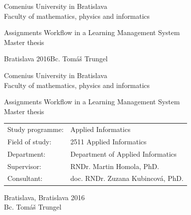 \documentclass[12pt, oneside]{book}
\def\mfrok{Bratislava 2016}
\def\mfnazov{Assignments Workflow in a Learning Management System}
\def\mftyp{Master thesis}
\def\mfautor{Bc. Tomáš Trungel}
\def\mfskolitel{RNDr. Martin Homola, PhD.}
\def\mfkonzultant{doc. RNDr. Zuzana Kubincová, PhD.}
\def\mfmiesto{Bratislava, \mfrok}
\def\mfodbor{2511 Applied Informatics}
\def\program{ Applied Informatics }
\def\mfpracovisko{ Department of Applied Informatics }
\begin{document}
     

\thispagestyle{empty}

\begin{center}
\sc\large
Comenius University in Bratislava\\
Faculty of mathematics, physics and informatics

\vfill

{\LARGE\mfnazov}\\
\mftyp
\end{center}

\vfill

{\sc\large 
\noindent 
\mfrok \hfill \hfill \mfautor
}

\eject %


\thispagestyle{empty}
\noindent

\begin{center}
\sc  
\large
Comenius University in Bratislava\\
Faculty of mathematics, physics and informatics

\vfill

{\LARGE\mfnazov}\\
\mftyp
\end{center}

\vfill

\noindent
\begin{tabular}{ll}
Study programme: & \program \\
Field of study: & \mfodbor \\
Department: & \mfpracovisko \\
Supervisor: & \mfskolitel \\
Consultant: & \mfkonzultant \\
\end{tabular}

\vfill


\noindent \mfmiesto\\
\mfautor

\eject %




\end{document}
